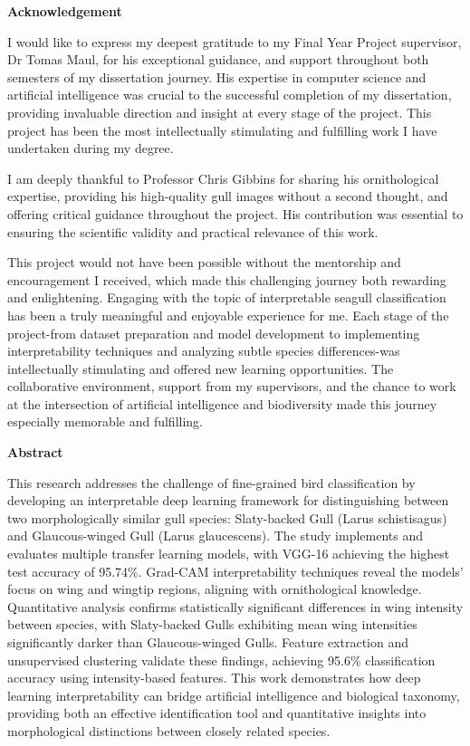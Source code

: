 \documentclass[a4paper,12pt]{report}
\begin{document}

\newpage
\begin{center}
    \textbf{Acknowledgement}
\end{center}

I would like to express my deepest gratitude to my Final Year Project supervisor, Dr Tomas Maul, for his exceptional guidance, and support throughout both semesters of my dissertation journey. His expertise in computer science and artificial intelligence was crucial to the successful completion of my dissertation, providing invaluable direction and insight at every stage of the project. This project has been the most intellectually stimulating and fulfilling work I have undertaken during my degree. 

I am deeply thankful to Professor Chris Gibbins for sharing his ornithological expertise, providing his high-quality gull images without a second thought, and offering critical guidance throughout the project. His contribution was essential to ensuring the scientific validity and practical relevance of this work.

This project would not have been possible without the mentorship and encouragement I received, which made this challenging journey both rewarding and enlightening. Engaging with the topic of interpretable seagull classification has been a truly meaningful and enjoyable experience for me. Each stage of the project-from dataset preparation and model development to implementing interpretability techniques and analyzing subtle species differences-was intellectually stimulating and offered new learning opportunities. The collaborative environment, support from my supervisors, and the chance to work at the intersection of artificial intelligence and biodiversity made this journey especially memorable and fulfilling.

\newpage
\begin{center}
    \textbf{Abstract}
\end{center}

This research addresses the challenge of fine-grained bird classification by developing an interpretable deep learning framework for distinguishing between two morphologically similar gull species: Slaty-backed Gull (Larus schistisagus) and Glaucous-winged Gull (Larus glaucescens). The study implements and evaluates multiple transfer learning models, with VGG-16 achieving the highest test accuracy of 95.74\%. Grad-CAM interpretability techniques reveal the models' focus on wing and wingtip regions, aligning with ornithological knowledge. Quantitative analysis confirms statistically significant differences in wing intensity between species, with Slaty-backed Gulls exhibiting mean wing intensities significantly darker than Glaucous-winged Gulls. Feature extraction and unsupervised clustering validate these findings, achieving 95.6\% classification accuracy using intensity-based features. This work demonstrates how deep learning interpretability can bridge artificial intelligence and biological taxonomy, providing both an effective identification tool and quantitative insights into morphological distinctions between closely related species.
\end{document}
